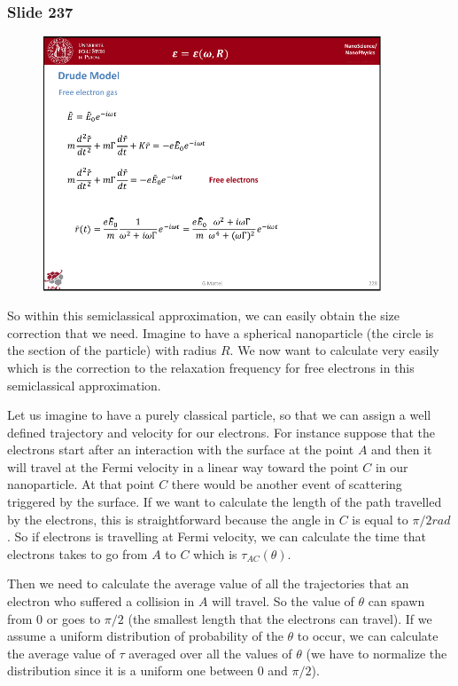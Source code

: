 \documentclass[../main/main.tex]{subfiles}
\begin{document}
\newpage

\subsubsection{Slide 237}

\begin{figure}[h!]
\centering
\includegraphics[page=10,width=0.9\textwidth]{../lessons/pdf_file/15_lesson.pdf}
\end{figure}

So within this semiclassical approximation, we can easily obtain the size correction that we need. Imagine to have a spherical nanoparticle (the circle is the section of the particle) with radius \( R \). We now want to calculate very easily which is the correction to the relaxation frequency for   free electrons in this semiclassical approximation.

Let us imagine to have a purely classical particle, so that we can assign a well defined trajectory and velocity for our electrons. For instance suppose that the electrons start after an interaction with the surface at the point \( A \) and then it will travel at the Fermi velocity in a linear way toward the point \( C \) in our nanoparticle. At that point \( C \) there would be another event of scattering triggered by the surface. If we want to calculate the length of the path travelled by the electrons, this is straightforward because the angle in \( C \) is equal to \( \pi /2 rad \). So if electrons is travelling at Fermi velocity, we can calculate the time that electrons takes to go from \( A \) to \( C \) which is \( \tau _{AC} (\theta ) \).

Then we need to calculate the average value of all the trajectories that an electron who suffered a collision in \( A \)
will travel. So the value of \( \theta  \) can spawn from \( 0 \) or goes to  \( \pi /2 \) (the smallest length that the electrons can travel).
If we assume a uniform distribution of probability of the \( \theta  \) to occur, we can calculate the average value of \( \tau  \) averaged over all the values of \( \theta  \) (we have to normalize the distribution since it is a uniform one between 0 and \( \pi /2 \)).
\end{document}
